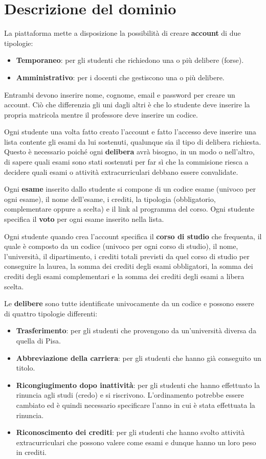 \section{Descrizione del dominio}
La piattaforma mette a disposizione la possibilità di creare
\textbf{account} di due tipologie:
\begin{itemize}
	\item \textbf{Temporaneo}: per gli studenti che richiedono
	      una o più delibere (forse).
	\item \textbf{Amministrativo}: per i docenti che gestiscono
	      una o più delibere.
\end{itemize}
Entrambi devono inserire nome, cognome, email e password per
creare un account. Ciò che differenzia gli uni dagli altri è che
lo studente deve inserire la propria matricola mentre il
professore deve inserire un codice.

Ogni studente una volta fatto creato l'account e fatto l'accesso
deve inserire una lista contente gli esami da lui sostenuti,
qualunque sia il tipo di delibera richiesta. Questo è necessario
poiché ogni \textbf{delibera} avrà bisogno, in un modo o
nell'altro, di sapere quali esami sono stati sostenuti per far
sì che la commisione riesca a decidere quali esami o attività
extracurriculari debbano essere convalidate.

Ogni \textbf{esame} inserito dallo studente si compone di un
codice esame (univoco per ogni esame), il nome dell'esame, i
crediti, la tipologia (obbligatorio, complementare oppure a
scelta) e il link al programma del corso. Ogni studente
specifica il \textbf{voto} per ogni esame inserito nella lista.

Ogni studente quando crea l'account specifica il
\textbf{corso di studio} che frequenta, il quale è composto da
un codice (univoco per ogni corso di studio), il nome,
l'università, il dipartimento, i crediti totali previsti da
quel corso di studio per conseguire la laurea, la somma dei
crediti degli esami obbligatori, la somma dei crediti degli
esami complementari e la somma dei crediti degli esami a libera
scelta.

Le \textbf{delibere} sono tutte identificate univocamente da un
codice e possono essere di quattro tipologie differenti:
\begin{itemize}
	\item \textbf{Trasferimento}: per gli studenti che
	      provengono da un'università diversa da quella di Pisa.
	\item \textbf{Abbreviazione della carriera}: per gli
	      studenti che hanno già conseguito un titolo.
	\item \textbf{Ricongiugimento dopo inattività}: per gli
	      studenti che hanno effettuato la rinuncia agli studi
	      (credo) e si riscrivono. L'ordinamento potrebbe essere
	      cambiato ed è quindi necessario specificare l'anno in
	      cui è stata effettuata la rinuncia.
	\item \textbf{Riconoscimento dei crediti}: per gli studenti
	      che hanno svolto attività extracurriculari che possono
	      valere come esami e dunque hanno un loro peso in
	      crediti.
\end{itemize}

